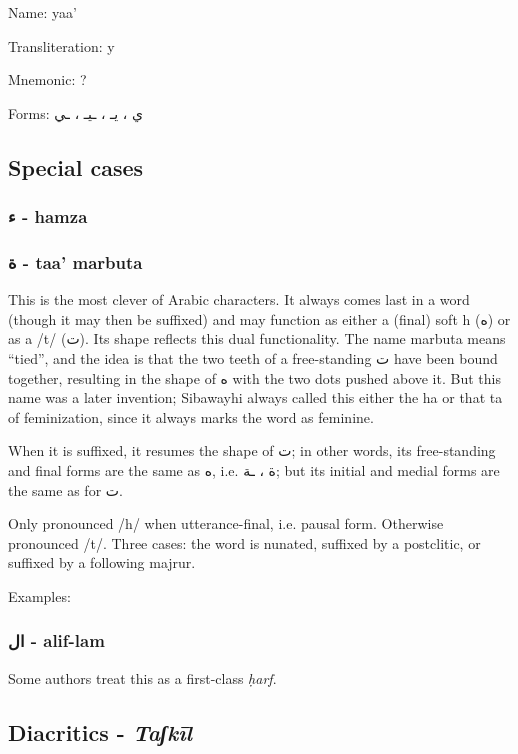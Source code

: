 \documentclass[11pt]{article}
\newcommand{\harf}{\textit{ḥarf}}
\begin{document}
\noindent Name: yaa'

\noindent Transliteration: y

\noindent Mnemonic:  ?

\noindent Forms: \textarabic{ي ، يـ ، ـيـ ، ـي}

\subsection{Special cases}

\subsubsection{\textarabic{ء} - hamza}

\subsubsection{\textarabic{ة} - taa' marbuta}

This is the most clever of Arabic characters. It always comes last in
a word (though it may then be suffixed) and may function as either a
(final) soft h (\textarabic{ه}) or as a /t/ (\textarabic{ت}). Its
shape reflects this dual functionality. The name marbuta means
``tied'', and the idea is that the two teeth of a free-standing
\textarabic{ت} have been bound together, resulting in the shape of
\textarabic{ه} with the two dots pushed above it. But this name was a
later invention; Sibawayhi always called this either the ha or that ta
of feminization, since it always marks the word as feminine.

When it is suffixed, it resumes the shape of \textarabic{ت}; in other
words, its free-standing and final forms are the same as
\textarabic{ه}, i.e. \textarabic{ة ، ـة}; but its initial and medial
forms are the same as for \textarabic{ت}.

Only pronounced /h/ when utterance-final, i.e. pausal form. Otherwise
pronounced /t/. Three cases: the word is nunated, suffixed by a
postclitic, or suffixed by a following majrur.

Examples:

\subsubsection{\textarabic{ال} - alif-lam}

Some authors treat this as a first-class \harf.


\subsection{Diacritics - \textit{Taʃkīl}}
\end{document}
